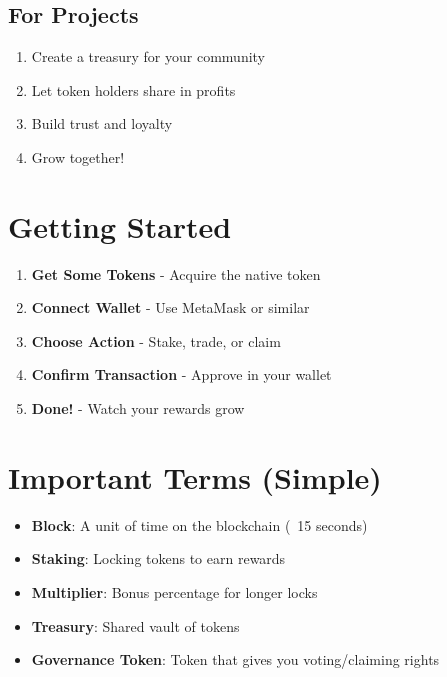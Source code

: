 \documentclass[12pt,a4paper]{article}
\begin{document}
\subsection*{For Projects}
\begin{enumerate}
    \item Create a treasury for your community
    \item Let token holders share in profits
    \item Build trust and loyalty
    \item Grow together! 🚀
\end{enumerate}

\vspace{0.5cm}

\section*{\textcolor{maincolor}{Getting Started}}

\begin{enumerate}
    \item \textbf{Get Some Tokens} - Acquire the native token
    \item \textbf{Connect Wallet} - Use MetaMask or similar
    \item \textbf{Choose Action} - Stake, trade, or claim
    \item \textbf{Confirm Transaction} - Approve in your wallet
    \item \textbf{Done!} - Watch your rewards grow
\end{enumerate}

\vspace{0.5cm}

\section*{\textcolor{maincolor}{Important Terms (Simple)}}

\begin{itemize}
    \item \textbf{Block}: A unit of time on the blockchain (~15 seconds)
    \item \textbf{Staking}: Locking tokens to earn rewards
    \item \textbf{Multiplier}: Bonus percentage for longer locks
    \item \textbf{Treasury}: Shared vault of tokens
    \item \textbf{Governance Token}: Token that gives you voting/claiming rights
\end{itemize}
\end{document}
